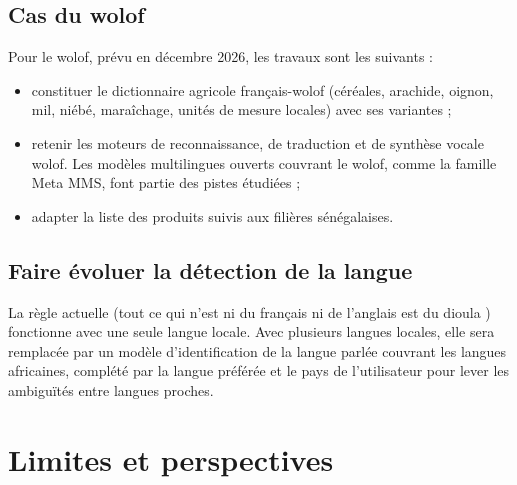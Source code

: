 \documentclass[12pt,a4paper]{article}
\begin{document}
\subsection{Cas du wolof}

Pour le wolof, prévu en décembre 2026, les travaux sont les suivants :
\begin{itemize}
  \item constituer le dictionnaire agricole français-wolof (céréales, arachide, oignon, mil, niébé,
  maraîchage, unités de mesure locales) avec ses variantes ;
  \item retenir les moteurs de reconnaissance, de traduction et de synthèse vocale wolof. Les modèles
  multilingues ouverts couvrant le wolof, comme la famille Meta MMS, font partie des pistes étudiées ;
  \item adapter la liste des produits suivis aux filières sénégalaises.
\end{itemize}

\subsection{Faire évoluer la détection de la langue}

La règle actuelle (\og tout ce qui n'est ni du français ni de l'anglais est du dioula \fg{})
fonctionne avec une seule langue locale. Avec plusieurs langues locales, elle sera remplacée par un
modèle d'identification de la langue parlée couvrant les langues africaines, complété par la langue
préférée et le pays de l'utilisateur pour lever les ambiguïtés entre langues proches.

\section{Limites et perspectives}
\end{document}
